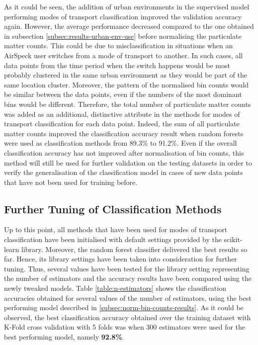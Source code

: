 \documentclass[bsc,frontabs,twoside,singlespacing,parskip,deptreport]{infthesis}     %
\begin{document}
As it could be seen, the addition of urban environments in the supervised model performing modes of transport classification improved the validation accuracy again. However, the average performance decreased compared to the one obtained  in subsection \ref{subsec:results-urban-env-use} before normalising the particulate matter counts. This could be due to misclassification in situations when an AirSpeck user switches from a mode of transport to another. In such cases, all data points from the time period when the switch happens would be most probably clustered in the same urban environment as they would be part of the same location cluster. Moreover, the pattern of the normalised bin counts would be similar between the data points, even if the numbers of the most dominant bins would be different. Therefore, the total number of particulate matter counts was added as an additional, distinctive attribute in the methods for modes of transport classification for each data point. Indeed, the sum of all particulate matter counts improved the classification accuracy result when random forests were used as classification methods from 89.3\% to 91.2\%. Even if the overall classification accuracy has not improved after normalisation of bin counts, this method will still be used for further validation on the testing datasets in order to verify the generalisation of the classification model in cases of new data points that have not been used for training before. 


\subsection{Further Tuning of Classification Methods}
\label{subsec:classifier-tweaking}

Up to this point, all methods that have been used for modes of transport classification have been initialised with default settings provided by the scikit-learn library. Moreover, the random forest classifier delivered the best results so far. Hence, its library settings have been taken into consideration for further tuning. Thus, several values have been tested for the library setting representing the number of estimators and the accuracy results have been compared using the newly tweaked models. Table \ref{table:n-estimators} shows the classification accuracies obtained for several values of the number of estimators, using the best performing model described in \ref{subsec:norm-bin-counts-results}. As it could be observed, the best classification accuracy obtained over the training dataset with K-Fold cross validation with 5 folds was when 300 estimators were used for the best performing model, namely \textbf{92.8\%}.
\end{document}
